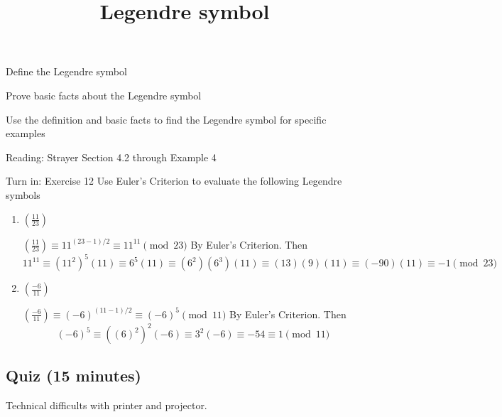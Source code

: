 \documentclass{ximera}
\title{Legendre symbol}
\begin{document}
\begin{abstract}
\end{abstract}
\maketitle


\begin{obj}
    \item Define the Legendre symbol
    \item Prove basic facts about the Legendre symbol
    \item Use the definition and basic facts to find the Legendre symbol for specific examples
\end{obj}


\begin{pre}
    \item[Reading:] Strayer Section 4.2 through Example 4
    \item[Turn in:] Exercise 12
     Use Euler's Criterion to evaluate the following Legendre symbols 
	\begin{enumerate}
 		\item $\left(\frac{11}{23}\right)$
		
		\begin{solution}
 			$\left(\frac{11}{23}\right)\equiv 11^{(23-1)/2}\equiv 11^{11}\pmod{23}$ By Euler's Criterion. Then
			\[11^{11}\equiv (11^{2})^{5}(11)\equiv 6^5(11)\equiv (6^2)(6^3)(11)\equiv (13)(9)(11)\equiv(-90)(11)\equiv -1\pmod{23}\]
		\end{solution}
		
		\item $\left(\frac{-6}{11}\right)$
		
		\begin{solution}
 			$\left(\frac{-6}{11}\right)\equiv (-6)^{(11-1)/2}\equiv (-6)^{5}\pmod{11}$ By Euler's Criterion. Then
			\[(-6)^{5}\equiv ((6)^{2})^{2}(-6)\equiv 3^2(-6)\equiv -54 \equiv 1\pmod{11}\]
		\end{solution}
	\end{enumerate}
 

    \end{pre}


\subsection{Quiz (15 minutes)}
Technical difficults with printer and projector.
\end{document}
